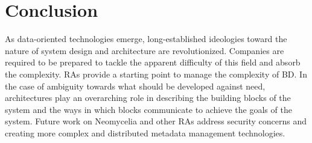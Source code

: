 \documentclass[conference]{IEEEtran}
\begin{document}
\section{Conclusion}

As data-oriented technologies emerge, long-established ideologies toward the nature of system design and architecture are revolutionized. Companies are required to be prepared to tackle the apparent difficulty of this field and absorb the complexity. RAs provide a starting point to manage the complexity of BD. In the case of ambiguity towards what should be developed against need, architectures play an overarching role in describing the building blocks of the system and the ways in which blocks communicate to achieve the goals of the system. Future work on Neomycelia and other RAs address security concerns and creating more complex and distributed metadata management technologies.



\end{document}
